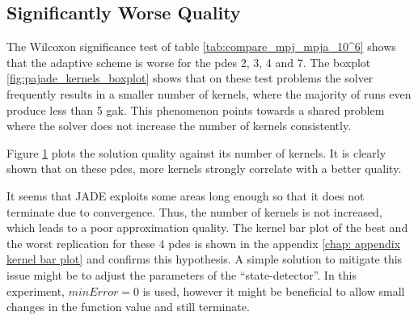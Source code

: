 \documentclass[./\jobname.tex]{subfiles}
\begin{document}
\subsection{Significantly Worse Quality}
\label{chap:pde 2 3 4 7}
The Wilcoxon significance test of table \ref{tab:compare_mpj_mpja_10^6} shows that the adaptive scheme is worse for the \gls{pde}s 2, 3, 4 and 7. The boxplot \ref{fig:pajade_kernels_boxplot} shows that on these test problems the solver frequently results in a smaller number of kernels, where the majority of runs even produce less than 5 \gls{gak}. This phenomenon points towards a shared problem where the solver does not increase the number of kernels consistently. 

Figure \ref{fig:pajade_pde2347_kernels_l2norm} plots the solution quality against its number of kernels. It is clearly shown that on these \gls{pde}s, more kernels strongly correlate with a better quality. 

\begin{figure}[H]
	\centering
	\noindent{}
	\label{fig:pajade_pde2347_kernels_l2norm}
\end{figure}

It seems that JADE exploits some areas long enough so that it does not terminate due to convergence. Thus, the number of kernels is not increased, which leads to a poor approximation quality. The kernel bar plot of the best and the worst replication for these 4 \gls{pde}s is shown in the appendix \ref{chap: appendix kernel bar plot} and confirms this hypothesis. A simple solution to mitigate this issue might be to adjust the parameters of the ``state-detector''. In this experiment, $minError = 0$ is used, however it might be beneficial to allow small changes in the function value and still terminate. 
\end{document}
